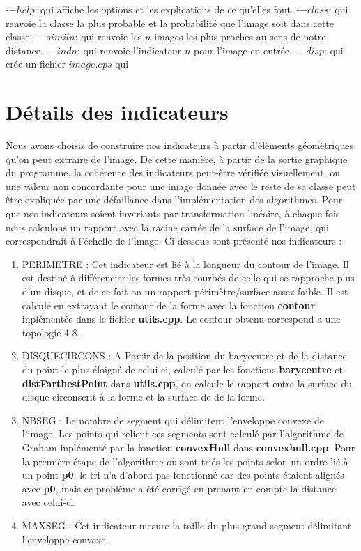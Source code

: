 \documentclass{report}
\begin{document}
\noindent-$-help$: qui affiche les options et les explications de ce qu'elles font.
\noindent-$-class$: qui renvoie la classe la plus probable et la probabilité que l'image soit dans cette classe.
\noindent-$-simil n$: qui renvoie les $n$ images les plus proches au sens de notre distance.
\noindent-$-indn$: qui renvoie l'indicateur $n$ pour l'image en entrée.
\noindent-$-disp$: qui crée un fichier $image.eps$ qui 


\section{Détails des indicateurs}
Nous avons choisis de construire nos indicateurs à partir d'éléments géométriques qu'on peut extraire de l'image. De cette manière, à partir de la sortie graphique du programme, la cohérence des indicateurs peut-être vérifiée visuellement, ou une valeur non concordante pour une image donnée avec le reste de sa classe peut être expliquée par une défaillance dans l'implémentation des algorithmes. Pour que nos indicateurs soient invariants par transformation linéaire, à chaque fois nous calculons un rapport avec la racine carrée de la surface de l'image, qui correspondrait à l'échelle de l'image. Ci-dessous sont présenté nos indicateurs :

\begin{enumerate}
\item PERIMETRE : Cet indicateur est lié à la longueur du contour de l'image. Il est destiné à différencier les formes très courbés de celle qui se rapproche plus d'un disque, et de ce fait on un rapport périmètre/surface assez faible. Il est calculé en extrayant le contour de la forme avec la fonction \textbf{contour} inplémentée dans le fichier \textbf{utils.cpp}. Le contour obtenu correspond a une topologie 4-8.
\item DISQUECIRCONS : A Partir de la position du barycentre et de la distance du point le plus éloigné de celui-ci, calculé par les fonctions \textbf{barycentre} et \textbf{distFarthestPoint} dans \textbf{utils.cpp}, on calcule le rapport entre la surface du disque circonscrit à la forme et la surface de de la forme.
\item NBSEG : Le nombre de segment qui délimitent l'enveloppe convexe de l'image. Les points qui relient ces segments sont calculé par l'algorithme de Graham inplémenté par la fonction \textbf{convexHull} dans \textbf{convexhull.cpp}. Pour la première étape de l'algorithme où sont triés les points selon un ordre lié à un point \textbf{p0}, le tri n'a d'abord pas fonctionné car des points étaient alignés avec \textbf{p0}, mais ce problème a été corrigé en prenant en compte la distance avec celui-ci.
\item MAXSEG : Cet indicateur mesure la taille du plus grand segment délimitant l'enveloppe convexe.
\end{enumerate}
\end{document}
